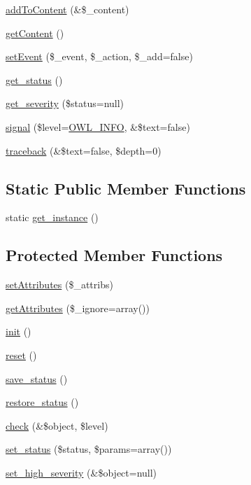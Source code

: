 \begin{DoxyCompactItemize}
\item 
\hyperlink{classBaseElement_abd48eef64ca4f419f26d66a0c0419908}{addToContent} (\&\$\_\-content)
\item 
\hyperlink{classBaseElement_af8c86b93bcdcfbc415bf96c622dc5516}{getContent} ()
\item 
\hyperlink{classBaseElement_ad5789f45f16aaa144716ee8558069c31}{setEvent} (\$\_\-event, \$\_\-action, \$\_\-add=false)
\item 
\hyperlink{class__OWL_a99ec771fa2c5c279f80152cc09e489a8}{get\_\-status} ()
\item 
\hyperlink{class__OWL_adf9509ef96858be7bdd9414c5ef129aa}{get\_\-severity} (\$status=null)
\item 
\hyperlink{class__OWL_a51ba4a16409acf2a2f61f286939091a5}{signal} (\$level=\hyperlink{owl_8severitycodes_8php_a139328861128689f2f4def6a399d9057}{OWL\_\-INFO}, \&\$text=false)
\item 
\hyperlink{class__OWL_aa29547995d6741b7d2b90c1d4ea99a13}{traceback} (\&\$text=false, \$depth=0)
\end{DoxyCompactItemize}
\subsection*{Static Public Member Functions}
\begin{DoxyCompactItemize}
\item 
static \hyperlink{classDocument_a840881b31974bd6f307fd6dcf73bc9c3}{get\_\-instance} ()
\end{DoxyCompactItemize}
\subsection*{Protected Member Functions}
\begin{DoxyCompactItemize}
\item 
\hyperlink{classBaseElement_aa623b042d23a5b77add8b3c452ec5855}{setAttributes} (\$\_\-attribs)
\item 
\hyperlink{classBaseElement_ae8237038633fc53db818f36da1940297}{getAttributes} (\$\_\-ignore=array())
\item 
\hyperlink{class__OWL_ae0ef3ded56e8a6b34b6461e5a721cd3e}{init} ()
\item 
\hyperlink{class__OWL_a2f2a042bcf31965194c03033df0edc9b}{reset} ()
\item 
\hyperlink{class__OWL_a9e49b9c76fbc021b244c6915ea536d71}{save\_\-status} ()
\item 
\hyperlink{class__OWL_a465eeaf40edd9f9c848841700c32ce55}{restore\_\-status} ()
\item 
\hyperlink{class__OWL_ad6f4f6946f40199dd0333cf219fa500e}{check} (\&\$object, \$level)
\item 
\hyperlink{class__OWL_aea912d0ede9b3c2a69b79072d94d4787}{set\_\-status} (\$status, \$params=array())
\item 
\hyperlink{class__OWL_a576829692a3b66e3d518853bf43abae3}{set\_\-high\_\-severity} (\&\$object=null)
\end{DoxyCompactItemize}
